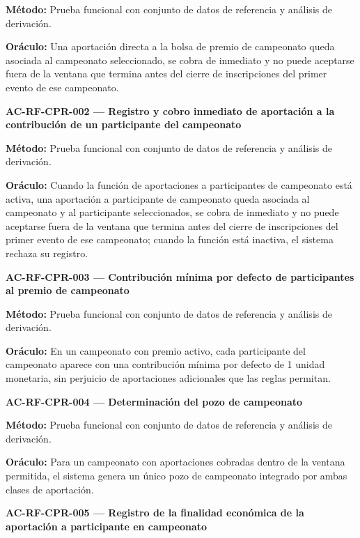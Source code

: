 \documentclass[10pt,letterpaper]{article}
\begin{document}
\textbf{Método:} Prueba funcional con conjunto de datos de referencia y análisis de derivación.\par
\textbf{Oráculo:} Una aportación directa a la bolsa de premio de campeonato queda asociada al campeonato seleccionado, se cobra de inmediato y no puede aceptarse fuera de la ventana que termina antes del cierre de inscripciones del primer evento de ese campeonato.\par\vspace{0.45em}
\noindent\textbf{AC-RF-CPR-002 --- Registro y cobro inmediato de aportación a la contribución de un participante del campeonato}\par
\textbf{Método:} Prueba funcional con conjunto de datos de referencia y análisis de derivación.\par
\textbf{Oráculo:} Cuando la función de aportaciones a participantes de campeonato está activa, una aportación a participante de campeonato queda asociada al campeonato y al participante seleccionados, se cobra de inmediato y no puede aceptarse fuera de la ventana que termina antes del cierre de inscripciones del primer evento de ese campeonato; cuando la función está inactiva, el sistema rechaza su registro.\par\vspace{0.45em}
\noindent\textbf{AC-RF-CPR-003 --- Contribución mínima por defecto de participantes al premio de campeonato}\par
\textbf{Método:} Prueba funcional con conjunto de datos de referencia y análisis de derivación.\par
\textbf{Oráculo:} En un campeonato con premio activo, cada participante del campeonato aparece con una contribución mínima por defecto de 1 unidad monetaria, sin perjuicio de aportaciones adicionales que las reglas permitan.\par\vspace{0.45em}
\noindent\textbf{AC-RF-CPR-004 --- Determinación del pozo de campeonato}\par
\textbf{Método:} Prueba funcional con conjunto de datos de referencia y análisis de derivación.\par
\textbf{Oráculo:} Para un campeonato con aportaciones cobradas dentro de la ventana permitida, el sistema genera un único pozo de campeonato integrado por ambas clases de aportación.\par\vspace{0.45em}
\noindent\textbf{AC-RF-CPR-005 --- Registro de la finalidad económica de la aportación a participante en campeonato}\par
\end{document}

